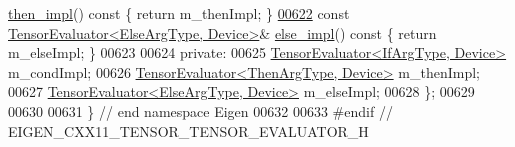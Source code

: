 \begin{DoxyCode}
      \hyperlink{struct_eigen_1_1_tensor_evaluator_3_01const_01_tensor_select_op_3_01_if_arg_type_00_01_then_arg_346b931156fad56ae8aa875afe41cb55_aba02423503271daeef9165ec50b3b93d}{then\_impl}()\textcolor{keyword}{ const }\{ \textcolor{keywordflow}{return} m\_thenImpl; \}
\hyperlink{struct_eigen_1_1_tensor_evaluator_3_01const_01_tensor_select_op_3_01_if_arg_type_00_01_then_arg_346b931156fad56ae8aa875afe41cb55_a29162f5f68ca5bb5cd7d431523a6e8e9}{00622}   \textcolor{keyword}{const} \hyperlink{struct_eigen_1_1_tensor_evaluator}{TensorEvaluator<ElseArgType, Device>}& 
      \hyperlink{struct_eigen_1_1_tensor_evaluator_3_01const_01_tensor_select_op_3_01_if_arg_type_00_01_then_arg_346b931156fad56ae8aa875afe41cb55_a29162f5f68ca5bb5cd7d431523a6e8e9}{else\_impl}()\textcolor{keyword}{ const }\{ \textcolor{keywordflow}{return} m\_elseImpl; \}
00623 
00624  \textcolor{keyword}{private}:
00625   \hyperlink{struct_eigen_1_1_tensor_evaluator}{TensorEvaluator<IfArgType, Device>} m\_condImpl;
00626   \hyperlink{struct_eigen_1_1_tensor_evaluator}{TensorEvaluator<ThenArgType, Device>} m\_thenImpl;
00627   \hyperlink{struct_eigen_1_1_tensor_evaluator}{TensorEvaluator<ElseArgType, Device>} m\_elseImpl;
00628 \};
00629 
00630 
00631 \} \textcolor{comment}{// end namespace Eigen}
00632 
00633 \textcolor{preprocessor}{#endif // EIGEN\_CXX11\_TENSOR\_TENSOR\_EVALUATOR\_H}
\end{DoxyCode}
